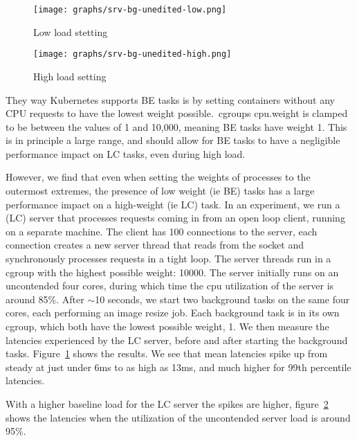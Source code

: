 \begin{figure*}[t]
    \centering
    \begin{subfigure}[t]{0.48\textwidth}
        \texttt{[image: graphs/srv-bg-unedited-low.png]}
        \caption{Low load stetting}\label{fig:srv-bg-unedited-low}
    \end{subfigure}
    \hspace{\fill}
    \begin{subfigure}[t]{0.48\textwidth}
        \texttt{[image: graphs/srv-bg-unedited-high.png]}
        \caption{High load setting}\label{fig:srv-bg-unedited-high}
    \end{subfigure}
    \caption{Latencies of the server and iteration counts of the background
    tasks in different load scenarios. Note the different y axis limits. The
    upper graphs show end-to-end request latencies, and the bottom graph is a
    histogram of completed iterations of the BE tasks}
\end{figure*}

They way Kubernetes supports BE tasks is by setting containers without any CPU
requests to have the lowest weight possible.\ cgroups cpu.weight is clamped to
be between the values of 1 and 10,000, meaning BE tasks have weight 1. This is
in principle a large range, and should allow for BE tasks to have a negligible
performance impact on LC tasks, even during high load. 

However, we find that even when setting the weights of processes to the
outermost extremes, the presence of low weight (ie BE) tasks has a large
performance impact on a high-weight (ie LC) task. In an experiment, we run a
(LC) server that processes requests coming in from an open loop client, running
on a separate machine. The client has 100 connections to the server, each
connection creates a new server thread that reads from the socket and
synchronously processes requests in a tight loop. The server threads run in a
cgroup with the highest possible weight: 10000. The server initially runs on an
uncontended four cores, during which time the cpu utilization of the server is
around 85\%. After $\sim$10 seconds, we start two background tasks on the same
four cores, each performing an image resize job. Each background task is in its
own cgroup, which both have the lowest possible weight, 1. We then measure the
latencies experienced by the LC server, before and after starting the background
tasks. Figure~\ref{fig:srv-bg-unedited-low} shows the results. We see that
mean latencies spike up from steady at just under 6ms to as high as 13ms, and
much higher for 99th percentile latencies.

With a higher baseline load for the LC server the spikes are higher,
figure~\ref{fig:srv-bg-unedited-high} shows the latencies when the
utilization of the uncontended server load is around 95\%.







